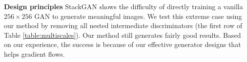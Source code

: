 \documentclass[10pt,twocolumn,letterpaper]{article}
\begin{document}



\textbf{Design principles} StackGAN shows the difficulty of directly training a vanilla $256{\times}256$ GAN to generate meaningful images. 
We test this extreme case using our method by removing all nested intermediate discriminators (the first row of Table \ref{table:multiscales}). Our method still generates fairly good results. 
Based on our experience, the success is because of our effective generator designs that helps gradient flows.
\end{document}
